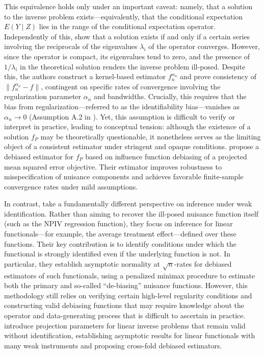 \documentclass[12pt]{article}
\theoremstyle{thmstyleone}%
\theoremstyle{thmstyletwo}%
\theoremstyle{thmstylethree}%
\begin{document}
    This equivalence holds only under an important caveat: namely, that a solution to the inverse problem exists—equivalently, that the conditional expectation ${E}(Y \mid Z)$ lies in the range of the conditional expectation operator. Independently of this, \citep{darolles} show that a solution exists if and only if a certain series involving the reciprocals of the eigenvalues $\lambda_i$ of the operator converges. However, since the operator is compact, its eigenvalues tend to zero, and the presence of $1/\lambda_i$ in the theoretical solution renders the inverse problem ill-posed. Despite this, the authors construct a kernel-based estimator $f_n^{\alpha_n}$ and prove consistency of $\| f_n^{\alpha_n} - f \|$, contingent on specific rates of convergence involving the regularization parameter $\alpha_n$ and bandwidths. Crucially, this requires that the bias from regularization—referred to as the identifiability bias—vanishes as $\alpha_n \to 0$ (Assumption A.2 in \citep{darolles}). Yet, this assumption is difficult to verify or interpret in practice, leading to conceptual tension: although the existence of a solution $f_P$ may be theoretically questionable, it nonetheless serves as the limiting object of a consistent estimator under stringent and opaque conditions. \citep{ghassami2025debiasedillposedregression} propose a debiased estimator for $f_P$ based on influence function debiasing of a projected mean squared error objective. Their estimator improves robustness to misspecification of nuisance components and achieves favorable finite-sample convergence rates under mild assumptions. 
    
    In contrast, \citep{neweak} take a fundamentally different perspective on inference under weak identification. Rather than aiming to recover the ill-posed nuisance function itself (such as the NPIV regression function), they focus on inference for linear functionals—for example, the average treatment effect—defined over these functions. Their key contribution is to identify conditions under which the functional is strongly identified even if the underlying function is not. In particular, they establish asymptotic normality at $\sqrt{n}$-rates for debiased estimators of such functionals, using a penalized minimax procedure to estimate both the primary and so-called “de-biasing” nuisance functions. However, this methodology still relies on verifying certain high-level regularity conditions and constructing valid debiasing functions that may require knowledge about the operator and data-generating process that is difficult to ascertain in practice.  {\citep{vanderlaan2025nonparametricinstrumentalvariableinference} introduce  projection parameters for linear inverse problems that remain valid without identification, establishing asymptotic results for linear functionals with many weak instruments and proposing cross-fold debiased estimators.}
    
\end{document}
